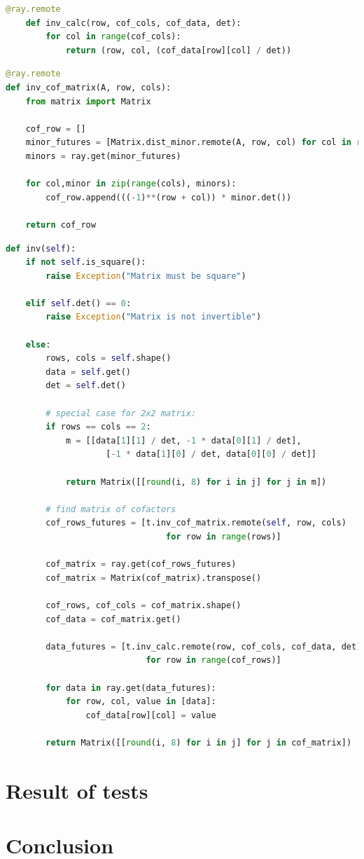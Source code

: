 \begin{lstlisting}[language=Python, caption={inv\_calc}]
    @ray.remote
    def inv_calc(row, cof_cols, cof_data, det):
        for col in range(cof_cols):
            return (row, col, (cof_data[row][col] / det))
    \end{lstlisting}
\pagebreak
\begin{lstlisting}[language=Python, caption={inv\_cof\_matrix}]
@ray.remote
def inv_cof_matrix(A, row, cols):
    from matrix import Matrix
    
    cof_row = []
    minor_futures = [Matrix.dist_minor.remote(A, row, col) for col in range(cols)]
    minors = ray.get(minor_futures)

    for col,minor in zip(range(cols), minors):
        cof_row.append(((-1)**(row + col)) * minor.det())

    return cof_row
\end{lstlisting}
\begin{lstlisting}[language=Python, caption={Parallelized inverse function}]
def inv(self):
    if not self.is_square():
        raise Exception("Matrix must be square")

    elif self.det() == 0:
        raise Exception("Matrix is not invertible")

    else:
        rows, cols = self.shape()
        data = self.get()
        det = self.det()

        # special case for 2x2 matrix:
        if rows == cols == 2:
            m = [[data[1][1] / det, -1 * data[0][1] / det],
                    [-1 * data[1][0] / det, data[0][0] / det]]

            return Matrix([[round(i, 8) for i in j] for j in m])

        # find matrix of cofactors
        cof_rows_futures = [t.inv_cof_matrix.remote(self, row, cols) 
                                for row in range(rows)]
        
        cof_matrix = ray.get(cof_rows_futures)
        cof_matrix = Matrix(cof_matrix).transpose()

        cof_rows, cof_cols = cof_matrix.shape()
        cof_data = cof_matrix.get()

        data_futures = [t.inv_calc.remote(row, cof_cols, cof_data, det) 
                            for row in range(cof_rows)]

        for data in ray.get(data_futures):
            for row, col, value in [data]:
                cof_data[row][col] = value

        return Matrix([[round(i, 8) for i in j] for j in cof_matrix])
\end{lstlisting}


\section{Result of tests}


\section{Conclusion}


